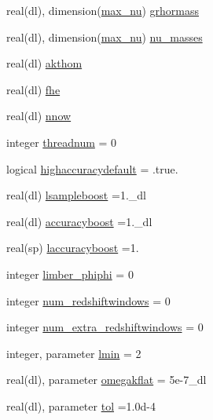 \begin{DoxyCompactItemize}
\item 
real(dl), dimension(\mbox{\hyperlink{namespacemodelparams_a5e3667fcd2aae0fb15654c207fc6830e}{max\+\_\+nu}}) \mbox{\hyperlink{namespacemodelparams_aea40a307408a18a8b9e794a71c409f18}{grhormass}}
\item 
real(dl), dimension(\mbox{\hyperlink{namespacemodelparams_a5e3667fcd2aae0fb15654c207fc6830e}{max\+\_\+nu}}) \mbox{\hyperlink{namespacemodelparams_a4cbebdfc6776f516e062c03bc9c26d7f}{nu\+\_\+masses}}
\item 
real(dl) \mbox{\hyperlink{namespacemodelparams_a5dc004ca6b9a5a2f7372357e5a481de7}{akthom}}
\item 
real(dl) \mbox{\hyperlink{namespacemodelparams_a237a630b241207072c775a0a483fccf2}{fhe}}
\item 
real(dl) \mbox{\hyperlink{namespacemodelparams_a75f2e158664252c3e9cf88ad48570e99}{nnow}}
\item 
integer \mbox{\hyperlink{namespacemodelparams_a33c1b20cf097d69a5c7c3dfda3dab4ab}{threadnum}} = 0
\item 
logical \mbox{\hyperlink{namespacemodelparams_a248f1c00694dc15ba911d43021a79d6c}{highaccuracydefault}} = .true.
\item 
real(dl) \mbox{\hyperlink{namespacemodelparams_ab2930a201db30785a690dd81ab50f4d2}{lsampleboost}} =1.\+\_\+dl
\item 
real(dl) \mbox{\hyperlink{namespacemodelparams_abb9bb8b33d3369c3a551e3d4531133e1}{accuracyboost}} =1.\+\_\+dl
\item 
real(sp) \mbox{\hyperlink{namespacemodelparams_a670eec63b2ba5b17870ecc149c352d95}{laccuracyboost}} =1.
\item 
integer \mbox{\hyperlink{namespacemodelparams_a0a27a495392838f0bebb4cc754f548c1}{limber\+\_\+phiphi}} = 0
\item 
integer \mbox{\hyperlink{namespacemodelparams_a6617a935c25965a12d1cfd1f3a2a3e12}{num\+\_\+redshiftwindows}} = 0
\item 
integer \mbox{\hyperlink{namespacemodelparams_a9b9513ec2c0807b724060d4cc2b1f209}{num\+\_\+extra\+\_\+redshiftwindows}} = 0
\item 
integer, parameter \mbox{\hyperlink{namespacemodelparams_ac592a5921d58b2abb1fb48bb520fd87b}{lmin}} = 2
\item 
real(dl), parameter \mbox{\hyperlink{namespacemodelparams_a1945ea0e00217f55d85995eeae03eb18}{omegakflat}} = 5e-\/7\+\_\+dl
\item 
real(dl), parameter \mbox{\hyperlink{namespacemodelparams_aa0d6cc3ee9273208296f9f9ee8ce821f}{tol}} =1.\+0d-\/4

\end{DoxyCompactItemize}
